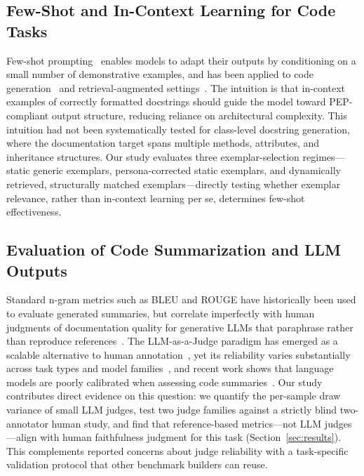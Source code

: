 \documentclass[pdflatex,sn-mathphys-ay]{sn-jnl}%
\theoremstyle{thmstyleone}%
\theoremstyle{thmstyletwo}%
\theoremstyle{thmstylethree}%
\begin{document}
\subsection{Few-Shot and In-Context Learning for Code Tasks}
Few-shot prompting~\cite{brown2020languagemodelsfewshotlearners} enables models to adapt their outputs by conditioning on a small number of demonstrative examples, and has been applied to code generation~\cite{beyond} and retrieval-augmented settings~\cite{Izacard2022}. The intuition is that in-context examples of correctly formatted docstrings should guide the model toward PEP-compliant output structure, reducing reliance on architectural complexity. This intuition had not been systematically tested for class-level docstring generation, where the documentation target spans multiple methods, attributes, and inheritance structures. {\color{blue}
Our study evaluates three exemplar-selection regimes---static generic exemplars, persona-corrected static exemplars, and dynamically retrieved, structurally matched exemplars---directly testing whether exemplar relevance, rather than in-context learning per se, determines few-shot effectiveness.
}


\subsection{Evaluation of Code Summarization and LLM Outputs}
Standard n-gram metrics such as BLEU and ROUGE have historically been used to evaluate generated summaries, but correlate imperfectly with human judgments of documentation quality for generative LLMs that paraphrase rather than reproduce references~\cite{Sun2023AutomaticCS}. The LLM-as-a-Judge paradigm has emerged as a scalable alternative to human annotation~\cite{li-etal-2025-generation,bavaresco-etal-2025-llms}, yet its reliability varies substantially across task types and model families~\cite{bavaresco-etal-2025-llms}, {\color{blue}
and recent work shows that language models are poorly calibrated when assessing code summaries~\cite{calibrationcodesumm2025}.
Our study contributes direct evidence on this question: we quantify the per-sample draw variance of small LLM judges, test two judge families against a strictly blind two-annotator human study, and find that reference-based metrics---not LLM judges---align with human faithfulness judgment for this task (Section~\ref{sec:results}). This complements reported concerns about judge reliability with a task-specific validation protocol that other benchmark builders can reuse.
}
\end{document}
